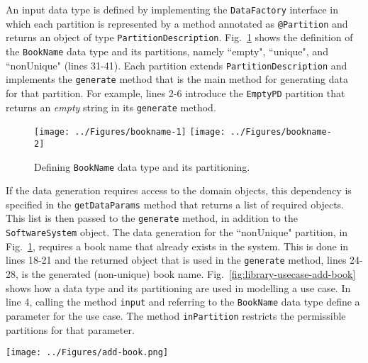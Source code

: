 An input data type is defined by implementing the \texttt{DataFactory} interface in which each partition is represented by a method annotated as \texttt{@Partition} and returns an object of type \texttt{PartitionDescription}. Fig.~\ref{fig:library-bookname} shows the definition of the \texttt{BookName} data type and its partitions, namely ``empty", ``unique", and ``nonUnique" (lines 31-41). Each partition extends \texttt{PartitionDescription} and implements the \texttt{generate} method that is the main method for generating data for that partition. For example, lines 2-6 introduce the \texttt{EmptyPD} partition that returns an \textit{empty} string in its \texttt{generate} method.

\begin{figure}[h]
\centering
{\texttt{[image: ../Figures/bookname-1]}%
\label{fig:library-bookname-1}}
\hfil
{\texttt{[image: ../Figures/bookname-2]}%
\label{fig:library-bookname-2}}
\caption{Defining \texttt{BookName} data type and its partitioning.}
\label{fig:library-bookname}
\end{figure} 

If the data generation requires access to the domain objects, this dependency is specified in the \texttt{getDataParams} method that returns a list of required objects. This list is then passed to the \texttt{generate} method, in addition to the \texttt{SoftwareSystem} object. The data generation for the ``nonUnique" partition, in Fig.~\ref{fig:library-bookname}, requires a book name that already exists in the system. This is done in lines 18-21 and the returned object that is used in the \texttt{generate} method, lines 24-28, is the generated (non-unique) book name. Fig.~\ref{fig:library-usecase-add-book} shows how a data type and its partitioning are used in modelling a use case. In line 4, calling the method \texttt{input} and referring to the \texttt{BookName} data type define a parameter for the use case. The method \texttt{inPartition} restricts the permissible partitions for that parameter.

\begin{figure*}[h]
\centering
\texttt{[image: ../Figures/add-book.png]}
\caption{Using the data types and their partitioning in use case modelling.}
\label{fig:library-usecase-add-book}
\end{figure*}

